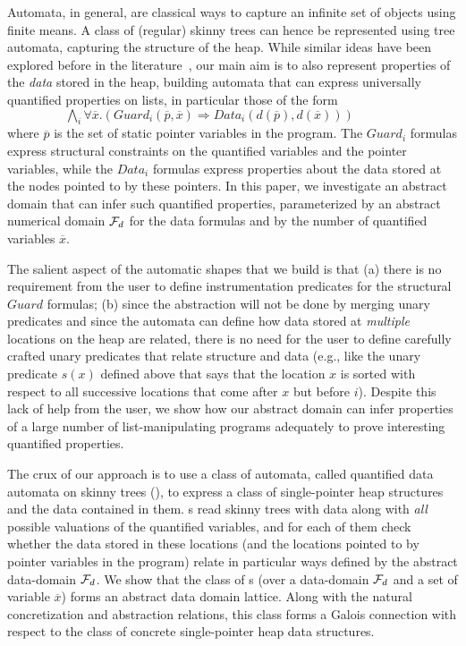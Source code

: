 \documentclass{llncs}
\begin{document}
Automata, in general, are classical ways to capture an infinite set of objects using
finite means. A class of (regular) skinny trees can hence be represented using tree
automata, capturing the structure of the heap. While similar ideas have been
explored before in the literature~\cite{forest-automata}, our main aim is to also represent properties of
the \emph{data} stored in the heap, building automata that can express
universally quantified properties on lists, in particular those
of the form\\\newline
$~~~~~~~~~~~~~~~~~~~~~\bigwedge_i \forall \overline{x}. \left(\textit{Guard}_i(\overline{p},\overline{x}) \Rightarrow \textit{Data}_i(d(\overline{p}), d(\overline{x}))\right)$ \\\newline
where $\overline{p}$ is the set of static pointer variables in the program.
The $\textit{Guard}_i$ formulas express structural constraints on the quantified variables
and the pointer variables, while the $\textit{Data}_i$ formulas express properties about the
data stored at the nodes pointed to by these pointers. In this paper, we investigate
an abstract domain that can infer such quantified properties, parameterized by an abstract
numerical domain ${\cal F}_d$ for the data formulas and by the number of quantified variables $\overline{x}$.



The salient aspect of the automatic shapes that we build is that (a) there is no requirement
from the user to define instrumentation predicates for the structural $\textit{Guard}$
formulas; (b) since the abstraction will not be done by merging unary predicates and since
the automata can define how data stored at \emph{multiple} locations on the heap are related,
there is no need for the user to define carefully crafted unary predicates that relate structure and data
(e.g., like the unary predicate $s(x)$ defined above that says that the location $x$ is sorted with respect
to all successive locations that come after $x$ but before $i$). Despite this lack of help
from the user, we show how our abstract domain can infer properties of a large number
of list-manipulating programs adequately to prove interesting quantified properties.



The crux of our approach is to use a class of automata, called quantified data automata on skinny trees (\QSDA),
to express a class of single-pointer heap structures and the data contained in them. \QSDA s read skinny
trees with data along with \emph{all} possible valuations of the quantified variables, and for each of them
check whether the data stored in these locations (and the locations pointed to by pointer variables in the
program) relate in particular ways defined by the abstract data-domain ${\cal F}_d$. We show that the
class of \QSDA s (over a data-domain ${\cal F}_d$ and a set of variable $\overline{x}$) forms an abstract
data domain lattice. Along with the natural concretization and abstraction relations, this class forms
a Galois connection with respect to the class of concrete single-pointer heap data structures.
\end{document}
